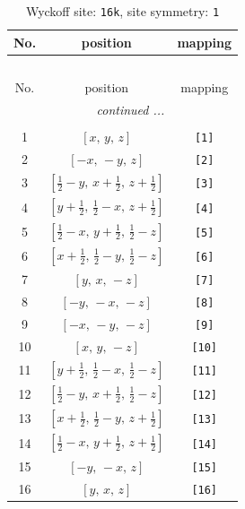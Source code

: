 \documentclass[fleqn,8pt]{jsarticle}
\begin{document}
\begin{longtable}{ccc}
\caption{Wyckoff site: {\tt 16k}, site symmetry: {\tt 1}}
 \\
 \hline \hline
No. & position & mapping \\ \hline \endfirsthead

\multicolumn{2}{l}{\tablename\ \thetable{}} \\
 \hline \hline
No. & position & mapping \\ \hline \endhead

 \hline \hline
\multicolumn{2}{r}{\footnotesize\it continued ...} \\ \endfoot

 \hline \hline
\multicolumn{2}{r}{} \\ \endlastfoot

1 & $\left[ x,\, y,\, z \right]$ & {\tt [1]} \\ \hline
2 & $\left[ - x,\, - y,\, z \right]$ & {\tt [2]} \\ \hline
3 & $\left[ \frac{1}{2} - y,\, x + \frac{1}{2},\, z + \frac{1}{2} \right]$ & {\tt [3]} \\ \hline
4 & $\left[ y + \frac{1}{2},\, \frac{1}{2} - x,\, z + \frac{1}{2} \right]$ & {\tt [4]} \\ \hline
5 & $\left[ \frac{1}{2} - x,\, y + \frac{1}{2},\, \frac{1}{2} - z \right]$ & {\tt [5]} \\ \hline
6 & $\left[ x + \frac{1}{2},\, \frac{1}{2} - y,\, \frac{1}{2} - z \right]$ & {\tt [6]} \\ \hline
7 & $\left[ y,\, x,\, - z \right]$ & {\tt [7]} \\ \hline
8 & $\left[ - y,\, - x,\, - z \right]$ & {\tt [8]} \\ \hline
9 & $\left[ - x,\, - y,\, - z \right]$ & {\tt [9]} \\ \hline
10 & $\left[ x,\, y,\, - z \right]$ & {\tt [10]} \\ \hline
11 & $\left[ y + \frac{1}{2},\, \frac{1}{2} - x,\, \frac{1}{2} - z \right]$ & {\tt [11]} \\ \hline
12 & $\left[ \frac{1}{2} - y,\, x + \frac{1}{2},\, \frac{1}{2} - z \right]$ & {\tt [12]} \\ \hline
13 & $\left[ x + \frac{1}{2},\, \frac{1}{2} - y,\, z + \frac{1}{2} \right]$ & {\tt [13]} \\ \hline
14 & $\left[ \frac{1}{2} - x,\, y + \frac{1}{2},\, z + \frac{1}{2} \right]$ & {\tt [14]} \\ \hline
15 & $\left[ - y,\, - x,\, z \right]$ & {\tt [15]} \\ \hline
16 & $\left[ y,\, x,\, z \right]$ & {\tt [16]} \\
\end{longtable}
\end{document}
